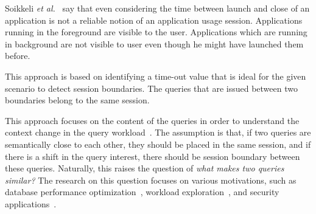 Soikkeli \textit{et al.}~\cite{soikkeli2011diversity} say that even considering the time between launch and close of an application is not a reliable notion of an application usage session. Applications running in the foreground are visible to the user. Applications which are running in background are not visible to user even though he might have launched them before. 


 This approach is based on identifying a time-out value that is ideal for the given scenario to detect session boundaries. The queries that are issued between two boundaries belong to the same session. 


 This approach focuses on the content of the queries in order to understand the context change in the query workload~\cite{jones2008, huang2006, hagen2011}. The assumption is that, if two queries are semantically close to each other, they should be placed in the same session, and if there is a shift in the query interest, there should be session boundary between these queries. Naturally, this raises the question of \textit{what makes two queries similar?} The research on this question focuses on various motivations, such as database performance optimization~\cite{aouiche2006}, workload exploration~\cite{makiyama2015text}, and security applications~\cite{kul2016ettu}.

